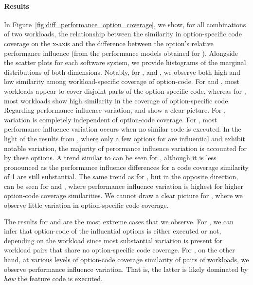 \paragraph*{Results}
{\color{red!50!black}
In Figure~\ref{fig:diff_performance_option_coverage}, we show, for all combinations of two workloads, the relationship between the similarity in option-specific code coverage on the x-axis and the difference between the option's relative performance influence (from the performance models obtained for ). Alongside the scatter plots for each software system, we provide histograms of the marginal distributions of both dimensions. 
Notably, for \batik, \dconvert and \jumper, we observe both high and low similarity among workload-specific coverage of option-code. For \htwo and \jadx, most workloads appear to cover disjoint parts of the option-specific code, whereas for \kanzi, most workloads show high similarity in the coverage of option-specific code. 
Regarding performance influence variation, \dconvert and \jadx show a clear picture. For \dconvert, variation is completely independent of option-code coverage. For \jadx, most performance influence variation occurs when no similar code is executed. In the light of the results from , where only a few options for \jadx are influential and exhibit notable variation, the majority of perormance influence variation is accounted for by these options. A trend similar to \jadx can be seen for \jumper, although it is less pronounced as the performance influence differences for a code coverage similarity of 1 are still substantial. 
The same trend as for \jadx, but in the opposite direction, can be seen for \htwo and \batik, where performance influence variation is highest for higher option-code coverage similarities. We cannot draw a clear picture for \kanzi, where we observe little variation in option-specific code coverage.

{The results for \dconvert and \jadx are the most extreme cases that we observe. For \jadx, we can infer that option-code of the influential options is either executed or not, depending on the workload since most substantial variation is present for workload pairs that share no option-specific code coverage. For \dconvert, on the other hand, at various levels of option-code coverage similarity of pairs of workloads, we observe performance influence variation. That is, the latter is likely dominated by \textit{how} the feature code is executed.}\\
}

